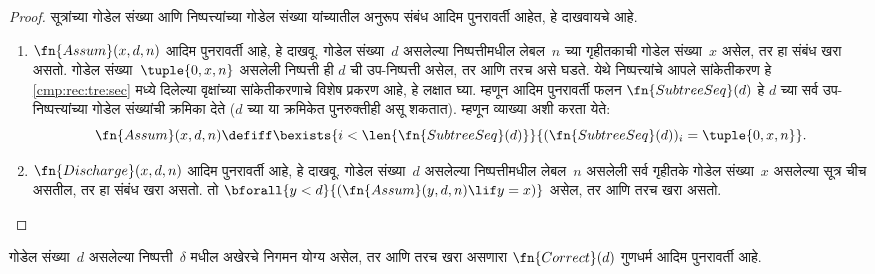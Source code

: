 \begin{proof}
  सूत्रांच्या गोडेल संख्या आणि निष्पत्त्यांच्या गोडेल
  संख्या यांच्यातील अनुरूप संबंध आदिम पुनरावर्ती आहेत, हे दाखवायचे आहे.
  \begin{enumerate}
  \item $\fn{Assum}(x, d, n)$ आदिम पुनरावर्ती आहे, हे दाखवू.
    गोडेल संख्या~$d$ असलेल्या निष्पत्तीमधील लेबल~$n$ च्या
    गृहीतकाची गोडेल संख्या~$x$ असेल, तर हा संबंध खरा असतो.
    गोडेल संख्या~$\tuple{0, x, n}$ असलेली निष्पत्ती ही
    $d$ ची उप-निष्पत्ती असेल, तर आणि तरच असे घडते. येथे
    निष्पत्त्यांचे आपले सांकेतीकरण हे
    \ref{cmp:rec:tre:sec} मध्ये दिलेल्या वृक्षांच्या
    सांकेतीकरणाचे विशेष प्रकरण आहे, हे लक्षात घ्या. म्हणून आदिम
    पुनरावर्ती फलन $\fn{SubtreeSeq}(d)$ हे $d$ च्या सर्व
    उप-निष्पत्त्यांच्या गोडेल संख्यांची क्रमिका देते
    ($d$ च्या या क्रमिकेत पुनरुक्तीही असू शकतात). म्हणून व्याख्या अशी करता येते:
    \[    \fn{Assum}(x, d, n) \defiff \bexists{i<\len{\fn{SubtreeSeq}(d)}}{(\fn{SubtreeSeq}(d))_i =
      \tuple{0, x, n}}.
    \]
  \item $\fn{Discharge}(x, d, n)$ आदिम पुनरावर्ती आहे, हे दाखवू.
    गोडेल संख्या~$d$ असलेल्या निष्पत्तीमधील लेबल~$n$
    असलेली सर्व गृहीतके गोडेल संख्या~$x$ असलेल्या सूत्र
    चीच असतील, तर हा संबंध खरा असतो. तो
    $\bforall{y<d}{(\fn{Assum}(y, d, n) \lif y
      = x)}$ असेल, तर आणि तरच खरा असतो.
  \end{enumerate}
\end{proof}

\begin{prop}
  \label{inc:art:pnd:prop:followsby}
  गोडेल संख्या~$d$ असलेल्या निष्पत्ती~$\delta$ मधील अखेरचे
  निगमन योग्य असेल, तर आणि तरच खरा असणारा $\fn{Correct}(d)$ गुणधर्म
  आदिम पुनरावर्ती आहे.
\end{prop}

